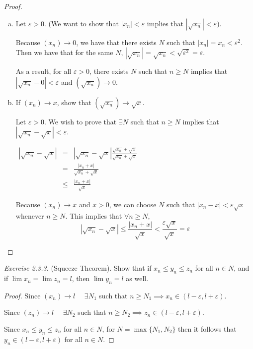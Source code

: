 \documentclass{tufte-book}
\theoremstyle{definition}
\numberwithin{section}{chapter}
\begin{document}
\begin{proof}
\begin{enumerate}[(a)]
\item Let $\varepsilon> 0$.  (We want to show that $|x_n| < \varepsilon$ implies that $|\sqrt{x_n}| < \varepsilon $).

Because $(x_n) \to 0$, we have that there exists $N$ such that $|x_n|= x_n < \varepsilon^2$.  Then we have that for the same $N$, $|\sqrt{x_n}| = \sqrt{x_n} < \sqrt{\varepsilon^2} = \varepsilon$.

As a result, for all $\varepsilon> 0$, there exists $N$ such that $n \geq N$ implies that $|\sqrt{x_n}- 0| < \varepsilon$ and $(\sqrt{x_n}) \to 0$.



\item If $(x_n) \to x$, show that $(\sqrt{x_n}) \to \sqrt{x}$.

Let $\varepsilon > 0$.  We wish to prove that $\exists N$ such that $n \geq N$ implies that $|\sqrt{x_n} - \sqrt{x}| < \varepsilon$.  

$\begin{array} {lcl} 
|\sqrt{x_n} -  \sqrt{x}|& = &|\sqrt{x_n} -  \sqrt{x}| \frac{\sqrt{x_n} +  \sqrt{x}}{\sqrt{x_n} +  \sqrt{x}}\\ 
	& = & \frac{|x_n +  x|}{\sqrt{x_n} +  \sqrt{x}}\\
&\leq	& \frac{|x_n +  x|}{\sqrt{x}}
    \end{array}$
    
    Because $(x_n ) \to x$ and $x>0$, we can choose $N$ such that $|x_n -x | <\varepsilon \sqrt{x}$ whenever $n \geq N$.  This implies that $\forall n \geq N$,
    \[		|\sqrt{x_n} - \sqrt{x}| \leq \frac{|x_n +  x|}{\sqrt{x}} < \frac{\varepsilon \sqrt{x}}{\sqrt{x}} = \varepsilon	\]

\end{enumerate} \end{proof}

\smallskip

\noindent
\emph{Exercise 2.3.3.} (Squeeze Theorem). Show that if $x_n \leq y_n \leq z_n$ for all $n \in N$, and if $\lim x_n = \lim z_n = l$, then $\lim y_n = l$ as well.
\begin{proof}
Since $(x_n) \to l$ $\quad \exists N_{1}$ such that $n \geq N_{1} \implies x_n \in (l- \varepsilon, l + \varepsilon)$.

Since $(z_n) \to l$ $\quad \exists  N_{2}$ such that $n \geq N_{2} \implies z_n \in (l- \varepsilon, l + \varepsilon)$.

Since $x_n \leq y_n \leq z_n$ for all $n \in N$, for $N = \max \{N_1, N_2\}$ then it follows that $y_n \in (l-\varepsilon, l + \varepsilon)$ for all $n \in N$.

\end{proof}
\end{document}
